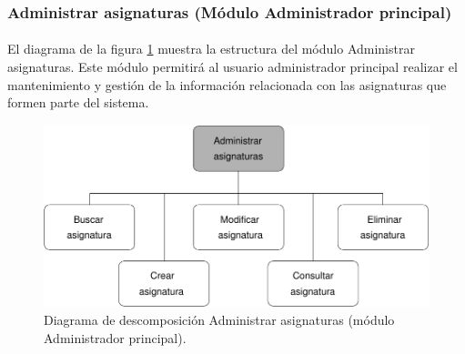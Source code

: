 \subsubsection{Administrar asignaturas (Módulo Administrador principal)}

  \paragraph{}El diagrama de la figura
  \ref{diagramaDescomposicionAdministrarAsignaturas} muestra la estructura del
  módulo Administrar asignaturas. Este módulo permitirá al usuario
  administrador principal realizar el mantenimiento y gestión de la información
  relacionada con las asignaturas que formen parte del sistema.


  \begin{figure}[!ht]
    \begin{center}
      \includegraphics[]{11.Disenyo_Arquitectonico/11.2.Diagramas_Descomposicion/11.2.2.Modulo_administrador_principal/AdministrarBBDD/AdministrarAsignaturas/Diagramas/administrar_asignaturas.pdf}
      \caption{Diagrama de descomposición Administrar asignaturas (módulo Administrador principal).}
      \label{diagramaDescomposicionAdministrarAsignaturas}
    \end{center}
  \end{figure}
